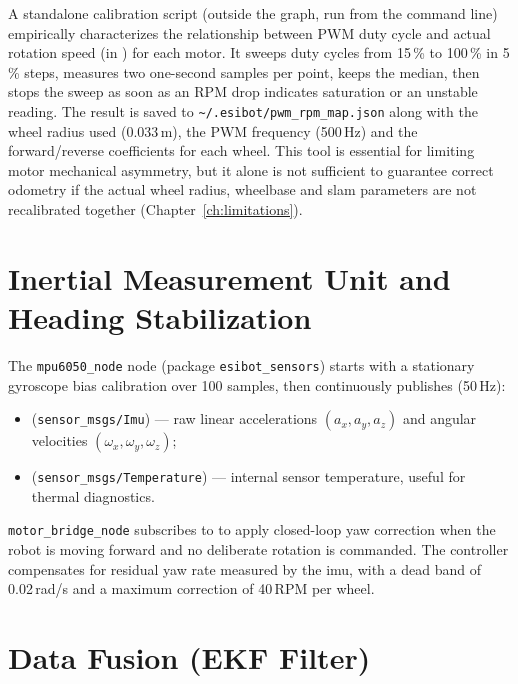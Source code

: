 A standalone calibration script (outside the \ros{} graph, run from the command line)
empirically characterizes the relationship between PWM duty cycle and actual rotation
speed (in \unit{\rpm}) for each motor. It sweeps duty cycles from 15\,\% to 100\,\% in
5\,\% steps, measures two one-second samples per point, keeps the median, then stops the
sweep as soon as an RPM drop indicates saturation or an unstable reading. The result is
saved to \texttt{\textasciitilde/.esibot/pwm\_rpm\_map.json} along with the wheel radius
used (0.033\,m), the PWM frequency (500\,Hz) and the forward/reverse coefficients for
each wheel. This tool is essential for limiting motor mechanical asymmetry, but it alone
is not sufficient to guarantee correct odometry if the actual wheel radius, wheelbase and
\gls{slam} parameters are not recalibrated together (Chapter~\ref{ch:limitations}).

\section{Inertial Measurement Unit and Heading Stabilization}
\label{sec:cbn_imu}

The \texttt{mpu6050\_node} node (package \texttt{esibot\_sensors}) starts with a
stationary gyroscope bias calibration over 100 samples, then continuously publishes
(50\,Hz):
\begin{itemize}
	\item {} (\texttt{sensor\_msgs/Imu}) --- raw linear accelerations
	      $(a_x, a_y, a_z)$ and angular velocities $(\omega_x, \omega_y, \omega_z)$;
	\item {} (\texttt{sensor\_msgs/Temperature}) --- internal sensor
	      temperature, useful for thermal diagnostics.
\end{itemize}

\texttt{motor\_bridge\_node} subscribes to  to apply closed-loop
yaw correction when the robot is moving forward and no deliberate rotation is commanded.
The controller compensates for residual yaw rate measured by the \gls{imu}, with a dead
band of 0.02\,rad/s and a maximum correction of 40\,RPM per wheel.

\section{Data Fusion (EKF Filter)}
\label{sec:cbn_ekf}

